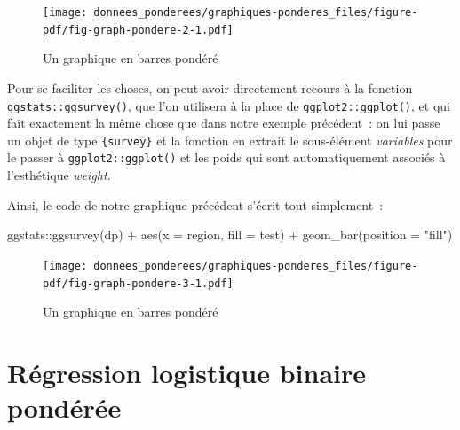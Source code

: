 \documentclass[
  letterpaper,
  DIV=11,
  numbers=noendperiod,
  oneside]{scrreprt}
\newenvironment{Shaded}{\begin{snugshade}}{\end{snugshade}}
\newcommand{\AttributeTok}[1]{\textcolor[rgb]{0.40,0.45,0.13}{#1}}
\newcommand{\FunctionTok}[1]{\textcolor[rgb]{0.28,0.35,0.67}{#1}}
\newcommand{\NormalTok}[1]{\textcolor[rgb]{0.00,0.23,0.31}{#1}}
\newcommand{\SpecialCharTok}[1]{\textcolor[rgb]{0.37,0.37,0.37}{#1}}
\newcommand{\StringTok}[1]{\textcolor[rgb]{0.13,0.47,0.30}{#1}}
\begin{document}
\begin{figure}[H]

{\centering \texttt{[image: donnees\_ponderees/graphiques-ponderes\_files/figure-pdf/fig-graph-pondere-2-1.pdf]}

}

\caption{\label{fig-graph-pondere-2}Un graphique en barres pondéré}

\end{figure}

Pour se faciliter les choses, on peut avoir directement recours à la
fonction \texttt{ggstats::ggsurvey()}, que l'on utilisera à la place de
\texttt{ggplot2::ggplot()}, et qui fait exactement la même chose que
dans notre exemple précédent~: on lui passe un objet de type
\texttt{\{survey\}} et la fonction en extrait le sous-élément
\emph{variables} pour le passer à \texttt{ggplot2::ggplot()} et les
poids qui sont automatiquement associés à l'esthétique \emph{weight}.

Ainsi, le code de notre graphique précédent s'écrit tout
simplement~:

\begin{Shaded}
\begin{Highlighting}[]
\NormalTok{ggstats}\SpecialCharTok{::}\FunctionTok{ggsurvey}\NormalTok{(dp) }\SpecialCharTok{+}
  \FunctionTok{aes}\NormalTok{(}\AttributeTok{x =}\NormalTok{ region, }\AttributeTok{fill =}\NormalTok{ test) }\SpecialCharTok{+}
  \FunctionTok{geom\_bar}\NormalTok{(}\AttributeTok{position =} \StringTok{"fill"}\NormalTok{)}
\end{Highlighting}
\end{Shaded}

\begin{figure}[H]

{\centering \texttt{[image: donnees\_ponderees/graphiques-ponderes\_files/figure-pdf/fig-graph-pondere-3-1.pdf]}

}

\caption{\label{fig-graph-pondere-3}Un graphique en barres pondéré}

\end{figure}

\hypertarget{sec-regression-logistique-binaire-ponderee}{%
\chapter{Régression logistique binaire
pondérée}\label{sec-regression-logistique-binaire-ponderee}}
\end{document}
